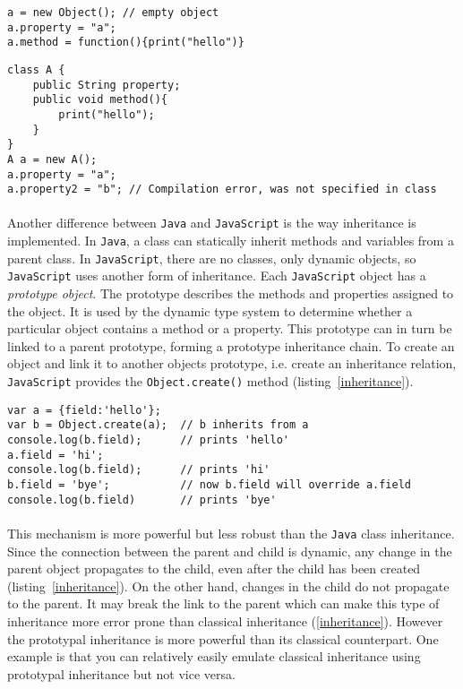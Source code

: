 \begin{lstlisting}[caption=JavaScript,label=dynclasses]
a = new Object(); // empty object
a.property = "a";
a.method = function(){print("hello")}
\end{lstlisting}	

\begin{lstlisting}[caption=Java,label=statclasses]
class A {
	public String property;
	public void method(){
		print("hello");
	}
}
A a = new A();
a.property = "a";
a.property2 = "b"; // Compilation error, was not specified in class
\end{lstlisting}
\paragraph{}
Another difference between \texttt{Java} and \texttt{JavaScript} is the way inheritance is implemented. In \texttt{Java}, a class can statically inherit methods and variables from a parent class. In \texttt{JavaScript}, there are no classes, only dynamic objects, so \texttt{JavaScript} uses another form of inheritance. Each \texttt{JavaScript} object has a \emph{prototype object}. The prototype describes the methods and properties assigned to the object. It is used by the dynamic type system to determine whether a particular object contains a method or a property. This prototype can in turn be linked to a parent prototype, forming a prototype inheritance chain. To create an object and link it to another objects prototype, i.e. create an inheritance relation, \texttt{JavaScript} provides the \texttt{Object.create()} method (listing~\ref{inheritance}).

\begin{lstlisting}[caption=Inheritance,label=inheritance]
var a = {field:'hello'};
var b = Object.create(a);  // b inherits from a
console.log(b.field);      // prints 'hello'
a.field = 'hi';
console.log(b.field);      // prints 'hi'
b.field = 'bye';           // now b.field will override a.field
console.log(b.field)       // prints 'bye'
\end{lstlisting}	
\paragraph{}
This mechanism is more powerful but less robust than the \texttt{Java} class inheritance. Since the connection between the parent and child is dynamic, any change in the parent object propagates to the child, even after the child has been created (listing~\ref{inheritance}). On the other hand, changes in the child do not propagate to the parent. It may break the link to the parent which can make this type of inheritance more error prone than classical inheritance (\ref{inheritance}). However the prototypal inheritance is more powerful than its classical counterpart. One example is that you can relatively easily emulate classical inheritance using prototypal inheritance but not vice versa\cite{mozilla}.


